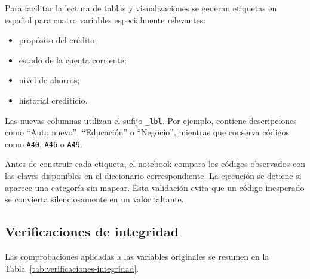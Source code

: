 Para facilitar la lectura de tablas y visualizaciones se generan
etiquetas en español para cuatro variables especialmente relevantes:

\begin{itemize}
    \item propósito del crédito;
    \item estado de la cuenta corriente;
    \item nivel de ahorros;
    \item historial crediticio.
\end{itemize}

Las nuevas columnas utilizan el sufijo \texttt{\_lbl}. Por ejemplo,
 contiene descripciones como ``Auto nuevo'',
``Educación'' o ``Negocio'', mientras que
 conserva códigos como \texttt{A40}, \texttt{A46} o
\texttt{A49}.

Antes de construir cada etiqueta, el notebook compara los códigos
observados con las claves disponibles en el diccionario correspondiente.
La ejecución se detiene si aparece una categoría sin mapear. Esta
validación evita que un código inesperado se convierta silenciosamente
en un valor faltante.

\subsection{Verificaciones de integridad}

Las comprobaciones aplicadas a las variables originales se resumen en la
Tabla~\ref{tab:verificaciones-integridad}.

